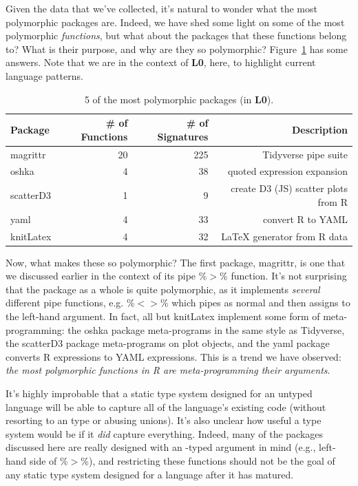 \documentclass[acmsmall,10pt,review,anonymous]{acmart}\settopmatter{printfolios=true,printccs=false,printacmref=false}
\begin{document}
Given the data that we've collected, it's natural to wonder what the most polymorphic packages are.
Indeed, we have shed some light on some of the most polymorphic {\it functions}, but what about the packages that these functions belong to?
What is their purpose, and why are they so polymorphic?
Figure~\ref{tab:packagepolysize} has some answers.
Note that we are in the context of {\bf L0}, here, to highlight current language patterns.

\begin{table}[ht]
\centering
\begin{tabular}{lrrr}
  \hline
  Package & \# of Functions &\# of Signatures & Description \\ 
  \hline
  magrittr & 20 & 225 & Tidyverse pipe suite \\ 
  oshka & 4 & 38 & quoted expression expansion \\ 
  scatterD3 & 1 & 9 & create D3 (JS) scatter plots from R \\ 
  yaml & 4 & 33 & convert R to YAML \\ 
  knitLatex & 4 & 32 & \LaTeX \xspace generator from R data \\ 
   \hline
\end{tabular}
\caption{5 of the most polymorphic packages (in {\bf L0}).}
\label{tab:packagepolysize}
\end{table}

Now, what makes these so polymorphic?
The first package, magrittr, is one that we discussed earlier in the context of its pipe \%$>$\% function. 
It's not surprising that the package as a whole is quite polymorphic, as it implements {\it several} different pipe functions, e.g. \%$<>$\% which pipes as normal and then assigns to the left-hand argument.
In fact, all but knitLatex implement some form of meta-programming:
the oshka package meta-programs in the same style as Tidyverse, the scatterD3 package meta-programs on plot objects, and the yaml package converts R expressions to YAML expressions.
This is a trend we have observed: {\it the most polymorphic functions in R are meta-programming their arguments}.

It's highly improbable that a static type system designed for an untyped language will be able to capture all of the language's existing code (without resorting to an \ANY type or abusing unions).
It's also unclear how useful a type system would be if it {\it did} capture everything.
Indeed, many of the packages discussed here are really designed with an \ANY-typed argument in mind (e.g., left-hand side of \%$>$\%), and restricting these functions should not be the goal of any static type system designed for a language after it has matured.
\end{document}
